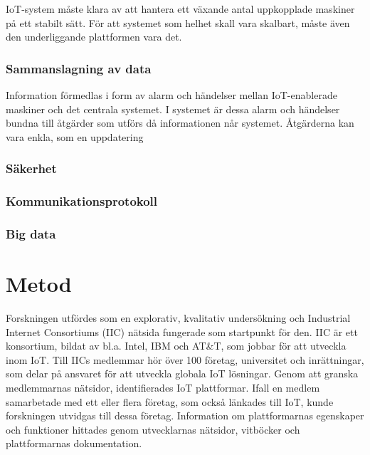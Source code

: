 IoT-system måste klara av att hantera ett växande antal uppkopplade maskiner
på ett stabilt sätt. För att systemet som helhet skall vara skalbart, måste
även den underliggande plattformen vara det.

\subsubsection{Sammanslagning av data}
Information förmedlas i form av alarm och händelser mellan IoT-enablerade
maskiner och det centrala systemet. I systemet är dessa alarm och händelser
bundna till åtgärder som utförs då informationen når systemet. Åtgärderna
kan vara enkla, som en uppdatering \cite{mashup_def} 


\subsubsection{Säkerhet}

\subsubsection{Kommunikationsprotokoll}

\subsubsection{Big data}



\section{Metod}
\label{sec:esimluku}
Forskningen utfördes som en explorativ, kvalitativ undersökning och
Industrial Internet Consortiums (IIC) nätsida fungerade som startpunkt för den.
IIC är ett konsortium, bildat av bl.a. Intel, IBM och AT\&T, som jobbar
för att utveckla  inom IoT.
Till IICs medlemmar hör över 100 företag, universitet och inrättningar, som
delar på ansvaret för att utveckla globala IoT lösningar.
Genom att granska medlemmarnas nätsidor, identifierades IoT plattformar.
Ifall en medlem samarbetade med ett eller flera företag, som också länkades
till IoT, kunde forskningen utvidgas till dessa företag.
Information om plattformarnas egenskaper och funktioner hittades genom
utvecklarnas nätsidor, vitböcker och plattformarnas dokumentation.

